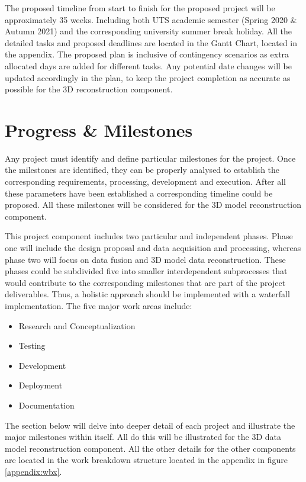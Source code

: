 \documentclass[12pt]{report}
\begin{document}
The proposed timeline from start to finish for the proposed project will be approximately  35 weeks. Including both UTS academic semester (Spring 2020 \& Autumn 2021) and the corresponding university summer break holiday.
All the detailed tasks and proposed deadlines are located in the Gantt Chart, located in the appendix.
The proposed plan is inclusive of contingency scenarios as extra allocated days are added for different tasks. Any potential date changes will be updated accordingly in the plan,  to keep the project completion as accurate as possible for the 3D reconstruction component.  

\section{Progress \& Milestones}
Any project must identify and define particular milestones for the project. 
Once the milestones are identified, they can be properly analysed to establish the corresponding requirements, processing, development and execution. 
After all these parameters have been established a corresponding timeline could be proposed. All these milestones will be considered for the 3D model reconstruction component. 

This project component includes two particular and independent phases. 
Phase one will include the design proposal and data acquisition and processing, whereas phase two will focus on data fusion and 3D model data reconstruction.  
These phases could be subdivided five into smaller interdependent subprocesses that would contribute to the corresponding milestones that are part of the project deliverables. 
Thus, a holistic approach should be implemented with a waterfall implementation. The five major work areas include:

\begin{itemize}
  \item Research and Conceptualization
  \item Testing 
  \item Development
  \item Deployment 
  \item Documentation
\end{itemize}

The section below will delve into deeper detail of each project and illustrate the major milestones within itself. All do this will be illustrated for the 3D data model reconstruction component. 
All the other details for the other components are located in the work breakdown structure located in the appendix in figure \ref{appendix:wbx}. 
\end{document}
